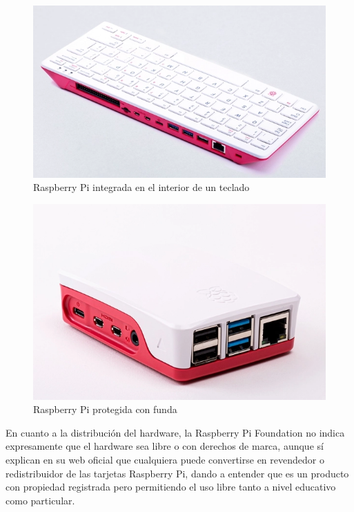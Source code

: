 \begin{figure}[h]
\centering
\includegraphics[scale=0.4]{archivos/rpi4keyboard.png}
\caption{Raspberry Pi integrada en el interior de un teclado}
\label{fig:rpi4keyboard}
\end{figure}
\begin{figure}[h]
\centering
\includegraphics[scale=0.4]{archivos/rpi4case.png}
\caption{Raspberry Pi protegida con funda}
\label{fig:rpi4case}
\end{figure}
\vspace{1em}
\par En cuanto a la distribución del hardware, la Raspberry Pi Foundation no indica expresamente que el hardware sea libre o con derechos de marca, aunque sí explican en su web oficial que cualquiera puede convertirse en revendedor o redistribuidor de las tarjetas Raspberry Pi, dando a entender que es un producto con propiedad registrada pero permitiendo el uso libre tanto a nivel educativo como particular.
\vspace{1em}
